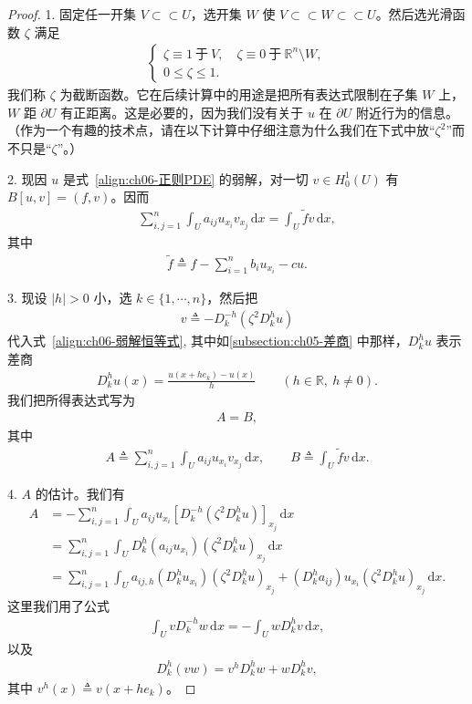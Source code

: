 \documentclass[../../main.tex]{subfiles}
\begin{document}
\begin{proof}
1. 固定任一开集 $V\subset \subset U$，选开集 $W$ 使 $V\subset \subset W\subset \subset U$。然后选光滑函数 $\zeta$ 满足
\begin{align*}
\begin{cases}
\zeta\equiv 1\ \text{于}\ V,\quad \zeta\equiv 0\ \text{于}\ \mathbb{R}^{n}\setminus W,\\
0\leqslant\zeta\leqslant 1.
\end{cases}
\end{align*}
我们称 $\zeta$ 为截断函数。它在后续计算中的用途是把所有表达式限制在子集 $W$ 上，$W$ 距 $\partial U$ 有正距离。这是必要的，因为我们没有关于 $u$ 在 $\partial U$ 附近行为的信息。（作为一个有趣的技术点，请在以下计算中仔细注意为什么我们在下式中放“$\zeta^{2}$”而不只是“$\zeta$”。）

2. 现因 $u$ 是式~\eqref{align:ch06-正则PDE} 的弱解，对一切 $v\in H^{1}_{0}(U)$ 有 $B[u,v]=(f,v)$。因而
\begin{align}
\sum_{i,j=1}^{n}\int_{U}a_{ij}u_{x_{i}}v_{x_{j}}\,\mathrm{d}x=\int_{U}\widetilde{f}v\,\mathrm{d}x,
\end{align}
其中
\begin{align}
\widetilde{f}\triangleq f-\sum_{i=1}^{n}b_{i}u_{x_{i}}-cu.
\end{align}

3. 现设 $|h|>0$ 小，选 $k\in\{1,\cdots,n\}$，然后把
\begin{align}
v\triangleq-D_{k}^{-h}(\zeta^{2}D_{k}^{h}u)
\end{align}
代入式~\eqref{align:ch06-弱解恒等式}, 其中如\cref{subsection:ch05-差商} 中那样，$D_{k}^{h}u$ 表示差商
\begin{align*}
D_{k}^{h}u(x)=\frac{u(x+he_{k})-u(x)}{h}\qquad (h\in\mathbb{R},\ h\neq 0).
\end{align*}
我们把所得表达式写为
\begin{align}
A=B,
\end{align}
其中
\begin{align*}
A\triangleq\sum_{i,j=1}^{n}\int_{U}a_{ij}u_{x_{i}}v_{x_{j}}\,\mathrm{d}x,\qquad
B\triangleq\int_{U}\widetilde{f}v\,\mathrm{d}x.
\end{align*}

4. $A$ 的估计。我们有
\begin{align}
A&=-\sum_{i,j=1}^{n}\int_{U}a_{ij}u_{x_{i}}\left[D_{k}^{-h}(\zeta^{2}D_{k}^{h}u)\right]_{x_{j}}\,\mathrm{d}x\\
&=\sum_{i,j=1}^{n}\int_{U}D_{k}^{h}(a_{ij}u_{x_{i}})(\zeta^{2}D_{k}^{h}u)_{x_{j}}\,\mathrm{d}x\\
&=\sum_{i,j=1}^{n}\int_{U}a_{ij,h}(D_{k}^{h}u_{x_{i}})(\zeta^{2}D_{k}^{h}u)_{x_{j}}+(D_{k}^{h}a_{ij})u_{x_{i}}(\zeta^{2}D_{k}^{h}u)_{x_{j}}\,\mathrm{d}x.
\end{align}
这里我们用了公式
\begin{align}
\int_{U}vD_{k}^{-h}w\,\mathrm{d}x=-\int_{U}wD_{k}^{h}v\,\mathrm{d}x,
\end{align}
以及
\begin{align}
D_{k}^{h}(vw)=v^{h}D_{k}^{h}w+wD_{k}^{h}v,
\end{align}
其中 $v^{h}(x)\triangleq v(x+he_{k})$。


\end{proof}
\end{document}
